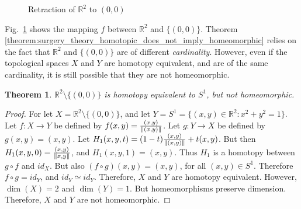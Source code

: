 \documentclass[oneside]{book}
\theoremstyle{mystyle}
\newtheorem{theorem}{Theorem}[section]
\DeclarePairedDelimiter\norm{\lVert}{\rVert}
\begin{document}
\begin{figure}
    \centering
    \vspace{-5ex}
    \vspace{-1ex}
    \caption{Retraction of $\mathbb{R}^{2}$ to $(0,0)$}
    \label{fig:surgery_theory_course_homotopy_equivalence_diagram_of_plane_with_point}
\end{figure}
Fig.~\ref{fig:surgery_theory_course_homotopy_equivalence_diagram_of_plane_with_point} shows the mapping $f$ between $\mathbb{R}^{2}$ and $\{(0,0)\}$. Theorem \ref{theorem:surgery_theory_homotopic_does_not_imply_homeomorphic} relies on the fact that $\mathbb{R}^2$ and $\{(0,0)\}$ are of different \textit{cardinality}. However, even if the topological spaces $X$ and $Y$ are homotopy equivalent, and are of the same cardinality, it is still possible that they are not homeomorphic.
\begin{theorem}
\label{theorem:surgery_theory_Homotopy_equivalance_of_plane_without_point_and_unit_disc_but_not_homeomorphic}
$\mathbb{R}^{2}\setminus\{(0,0)\}$ is homotopy equivalent to $S^{1}$, but not homeomorphic.
\end{theorem}
\begin{proof}
For let $X = \mathbb{R}^{2}\setminus\{(0,0)\}$, and let $Y = S^{1} = \{(x,y)\in \mathbb{R}^{2}:x^2+y^2=1\}$. Let $f:X\rightarrow Y$ be defined by $f(x,y) = \frac{(x,y)}{\norm{(x,y)}}$. Let $g:Y\rightarrow X$ be defined by $g(x,y) = (x,y)$. Let $H_1(x,y,t) = (1-t)\frac{(x,y)}{\norm{(x,y)}}+t(x,y)$. But then $H_1(x,y,0) = \frac{(x,y)}{\norm{x,y}}$, and $H_1(x,y,1) = (x,y)$. Thus $H_1$ is a homotopy between $g\circ f$ and $id_{X}$. But also $(f\circ g)(x,y) = (x,y)$, for all $(x,y)\in S^{1}$. Therefore $f\circ g= id_{Y}$, and $id_{Y}\simeq id_{Y}$. Therefore, $X$ and $Y$ are homotopy equivalent. However, $\dim(X) = 2$ and $\dim(Y) = 1$. But homeomorphisms preserve dimension. Therefore, $X$ and $Y$ are not homeomorphic.
\end{proof}
\end{document}

